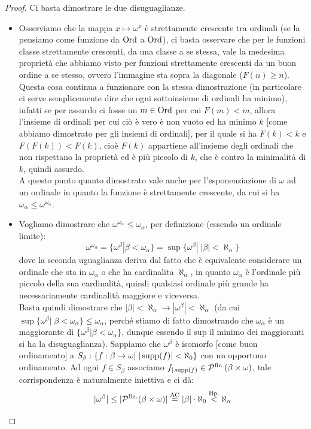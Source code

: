\begin{proof}
	Ci basta dimostrare le due disuguaglianze.
	\begin{itemize}
		\item[$\boxed{\leq}$] Osserviamo che la mappa $x \mapsto \omega^x$ \`e strettamente crescente tra ordinali (se la pensiamo come funzione da $\operatorname{Ord}$ a $\operatorname{Ord}$), ci basta osservare che per le funzioni classe strettamente crescenti, da una classe a se stessa, vale la medesima propriet\`a che abbiamo visto per funzioni strettamente crescenti da un buon ordine a se stesso, ovvero l'immagine sta sopra la diagonale ($F(n) \geq n$).\\
		Questa cosa continua a funzionare con la stessa dimostrazione (in particolare ci serve semplicemente dire che ogni sottoinsieme di ordinali ha minimo), infatti se per assurdo ci fosse un $m \in \operatorname{Ord}$ per cui $F(m) < m$, allora l'insieme di ordinali per cui ci\`o \`e vero \`e non vuoto ed ha minimo $k$ [come abbiamo dimostrato per gli insiemi di ordinali], per il quale si ha $F(k) < k$ e $F(F(k)) < F(k)$, cio\`e $F(k)$ appartiene all'insieme degli ordinali che non rispettano la 
		propriet\`a ed \`e pi\`u piccolo di $k$, che \`e contro la minimalit\`a di $k$, quindi assurdo.\\
		A questo punto quanto dimostrato vale anche per l'esponenziazione di $\omega$ ad un ordinale in quanto la funzione \`e strettamente crescente, da cui si ha $\omega_\alpha \leq \omega^{\omega_\alpha}$.
		\item[$\boxed{\geq}$] Vogliamo dimostrare che $\omega^{\omega_\alpha} \leq \omega_\alpha$, per definizione (essendo un ordinale limite):
		\[ \omega^{\omega_\alpha} = \{\omega^{\beta} | \beta < \omega_\alpha\} = \sup\{\omega^\beta |\;|\beta| < \aleph_\alpha\}
			\]
		dove la seconda uguaglianza deriva dal fatto che \`e equivalente considerare un ordinale che sta in $\omega_\alpha$ o che ha cardinalita $\aleph_\alpha$, in quanto $\omega_\alpha$ \`e l'ordinale pi\`u piccolo della sua cardinalit\`a, quindi qualsiasi ordinale pi\`u grande ha necessariamente cardinalit\`a maggiore e viceversa.\\
		Basta quindi dimostrare che $|\beta| < \aleph_\alpha \rightarrow |\omega^\beta| < \aleph_\alpha$ (da cui $\sup\{\omega^\beta | \; \beta < \omega_\alpha\} \leq \omega_\alpha$, perch\'e stiamo di fatto dimostrando che $\omega_\alpha$ \`e un maggiorante di $\{\omega^\beta | \beta < \omega_\alpha\}$, dunque essendo il sup il minimo dei maggioranti si ha la disuguaglianza).
		Sappiamo che $\omega^{\beta}$ \`e isomorfo [come buon ordinamento] a $S_\beta : \{f : \beta \to \omega |\;|\operatorname{supp}(f)|<\aleph_0\}$ con un opportuno ordinamento. Ad ogni $f \in S_\beta$ associamo $f_{|\operatorname{supp}(f)} \in \mathcal{P}^{\text{fin.}}(\beta \times \omega)$, tale corrispondenza \`e naturalmente iniettiva e ci d\`a:
		\[ |\omega^{\beta}| \leq |\mathcal{P}^{\text{fin.}}(\beta \times \omega)| \overset{\text{AC}}{=} |\beta| \cdot \aleph_0 \overset{\text{Hp.}}{<} \aleph_\alpha
			\]
	\end{itemize}
\end{proof}

